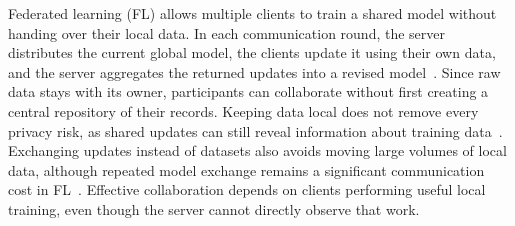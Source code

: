 \documentclass[journal]{IEEEtran}
\begin{document}
Federated learning (FL) allows multiple clients to train a shared model
without handing over their local data. In each communication round, the
server distributes the current global model, the clients update it using
their own data, and the server aggregates the returned updates into a
revised model~\cite{mcmahan2017communication}. Since raw data stays with
its owner, participants can collaborate without first creating a central
repository of their records. Keeping data local does not remove every
privacy risk, as shared updates can still reveal information about
training data~\cite{kairouz2021advances,zhu2019leakage,melis2019leakage}.
Exchanging updates instead of
datasets also avoids moving large volumes of local data, although repeated
model exchange remains a significant communication cost in
FL~\cite{mcmahan2017communication}. Effective collaboration depends on clients
performing useful local training, even though the server cannot directly
observe that work.
\end{document}
